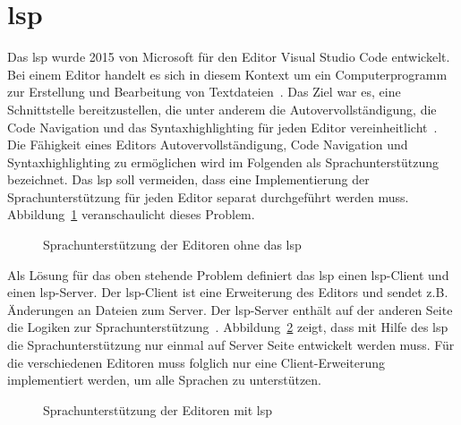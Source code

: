 \section{\acs{lsp}}

Das \ac{lsp} wurde 2015 von Microsoft für den Editor Visual Studio Code entwickelt.
Bei einem Editor handelt es sich in diesem Kontext um ein Computerprogramm zur Erstellung und Bearbeitung von Textdateien~\cite{editor-definition}.
Das Ziel war es, eine Schnittstelle bereitzustellen, die unter anderem die Autovervollständigung, die Code Navigation und das Syntaxhighlighting
für jeden Editor vereinheitlicht~\cite{lsp-witekio}.
Die Fähigkeit eines Editors Autovervollständigung, Code Navigation und Syntaxhighlighting zu ermöglichen wird im Folgenden als Sprachunterstützung bezeichnet.
Das \ac{lsp} soll vermeiden, dass eine Implementierung der Sprachunterstützung für jeden Editor separat durchgeführt werden muss.
Abbildung~\ref{fig:without-lsp} veranschaulicht dieses Problem.

\begin{figure}[htp] %
      \centering
      \caption{Sprachunterstützung der Editoren ohne das \acs{lsp}}
      \label{fig:without-lsp}
\end{figure}

Als Lösung für das oben stehende Problem definiert das \ac{lsp} einen \ac{lsp}-Client und einen \ac{lsp}-Server.
Der \ac{lsp}-Client ist eine Erweiterung des Editors und sendet z.B. Änderungen an Dateien zum Server.
Der \ac{lsp}-Server enthält auf der anderen Seite die Logiken zur Sprachunterstützung~\cite{lsp-witekio}.
Abbildung~\ref{fig:with-lsp} zeigt, dass mit Hilfe des \ac{lsp} die Sprachunterstützung nur einmal auf Server Seite entwickelt werden muss.
Für die verschiedenen Editoren muss folglich nur eine Client-Erweiterung implementiert werden, um alle Sprachen zu unterstützen.

\begin{figure}[htp] %
      \centering
      \caption{Sprachunterstützung der Editoren mit \acs{lsp}}
      \label{fig:with-lsp}
\end{figure}

